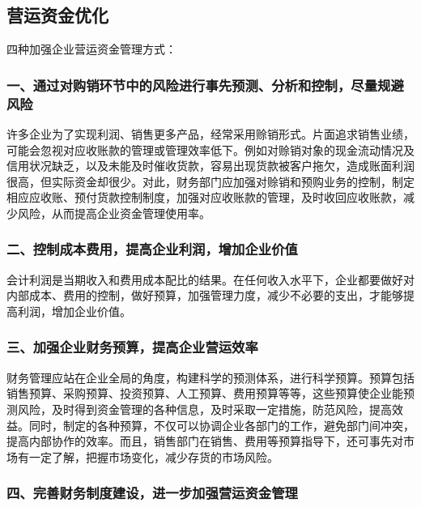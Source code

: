 \subsection { 营运资金优化}

    四种加强企业营运资金管理方式：

    \subsubsection {一、通过对购销环节中的风险进行事先预测、分析和控制，尽量规避风险}

    许多企业为了实现利润、销售更多产品，经常采用赊销形式。片面追求销售业绩，可能会忽视对应收账款的管理或管理效率低下。例如对赊销对象的现金流动情况及信用状况缺乏，以及未能及时催收货款，容易出现货款被客户拖欠，造成账面利润很高，但实际资金却很少。对此，财务部门应加强对赊销和预购业务的控制，制定相应应收账、预付货款控制制度，加强对应收账款的管理，及时收回应收账款，减少风险，从而提高企业资金管理使用率。

    \subsubsection {二、控制成本费用，提高企业利润，增加企业价值}

    会计利润是当期收入和费用成本配比的结果。在任何收入水平下，企业都要做好对内部成本、费用的控制，做好预算，加强管理力度，减少不必要的支出，才能够提高利润，增加企业价值。

    \subsubsection {三、加强企业财务预算，提高企业营运效率}

    财务管理应站在企业全局的角度，构建科学的预测体系，进行科学预算。预算包括销售预算、采购预算、投资预算、人工预算、费用预算等等，这些预算使企业能预测风险，及时得到资金管理的各种信息，及时采取一定措施，防范风险，提高效益。同时，制定的各种预算，不仅可以协调企业各部门的工作，避免部门间冲突，提高内部协作的效率。而且，销售部门在销售、费用等预算指导下，还可事先对市场有一定了解，把握市场变化，减少存货的市场风险。

    \subsubsection {四、完善财务制度建设，进一步加强营运资金管理}

